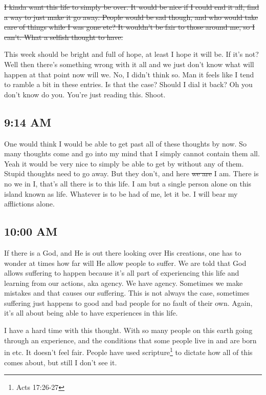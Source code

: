 \st{I kinda want this life to simply be over. It would be nice if I could end it all,
find a way to just make it go away. People would be sad though, and who would take
care of things while I was gone etc? It wouldn't be fair to those around me, so I 
can't. What a selfish thought to have.}

This week should be bright and full of hope, at least I hope it will be. If it's not?
Well then there's something wrong with it all and we just don't know what will happen
at that point now will we. No, I didn't think so. Man it feels like I tend to ramble
a bit in these entries. Is that the case? Should I dial it back? Oh you don't know do
you. You're just reading this. Shoot.

\subsection{9:14 AM}

One would think I would be able to get past all of these thoughts by now. So many
thoughts come and go into my mind that I simply cannot contain them all. Yeah it
would be very nice to simply be able to get by without any of them. Stupid thoughts
need to go away. But they don't, and here \st{we are} I am. There is no we in I,
that's all there is to this life. I am but a single person alone on this island known
as life. Whatever is to be had of me, let it be. I will bear my afflictions alone.

\subsection{10:00 AM}

If there is a God, and He is out there looking over His creations, one has to wonder
at times how far will He allow people to suffer. We are told that God allows
suffering to happen because it's all part of experiencing this life and learning from
our actions, aka agency. We have agency. Sometimes we make mistakes and that causes
our suffering. This is not always the case, sometimes suffering just happens to good
and bad people for no fault of their own. Again, it's all about being able to have
experiences in this life.

I have a hard time with this thought. With so many people on this earth going through
an experience, and the conditions that some people live in and are born in etc. It
doesn't feel fair. People have used scripture\footnote{Acts 17:26-27} to dictate how 
all of this comes about, but still I don't see it.